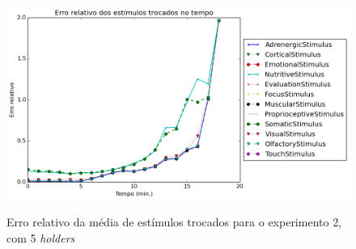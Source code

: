 \begin{apendicesenv}
\begin{figure}[H]
 \centering
 \caption{Erro relativo da média de estímulos trocados para o experimento 2, com 5 \textit{holders}}
 \includegraphics[scale=0.6]{04-figuras/experiments/exp_2/5/avgExchangedStimuliOverTime_err.png}
 \label{fig:exp_3_5_avgExchStimuli_err}
\end{figure}

\end{apendicesenv}

